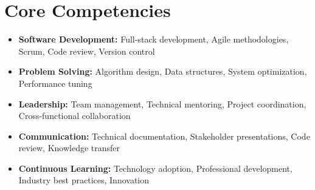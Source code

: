 \documentclass[10pt, letterpaper]{article}
\newenvironment{highlights}{
\begin{itemize}[
topsep=0.10 cm,
parsep=0.10 cm,
partopsep=0pt,
itemsep=0pt,
leftmargin=0 cm + 10pt
]
}{
\end{itemize}
} %
\begin{document}
\section{Core Competencies}
\vspace{0.1cm}

\begin{highlights}
\item \textbf{Software Development:} Full-stack development, Agile methodologies, Scrum, Code review, Version control
\item \textbf{Problem Solving:} Algorithm design, Data structures, System optimization, Performance tuning
\item \textbf{Leadership:} Team management, Technical mentoring, Project coordination, Cross-functional collaboration
\item \textbf{Communication:} Technical documentation, Stakeholder presentations, Code review, Knowledge transfer
\item \textbf{Continuous Learning:} Technology adoption, Professional development, Industry best practices, Innovation
\end{highlights}
\end{document}
